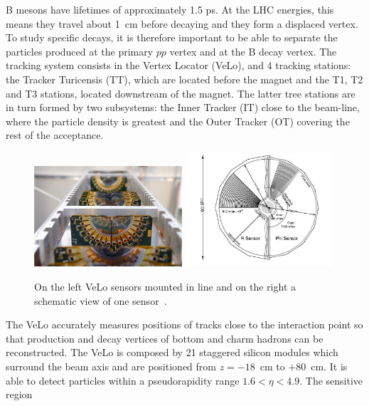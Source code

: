 B mesons have lifetimes of approximately 1.5 ps. At the LHC energies, this means they travel about
1~cm before decaying and they form a displaced vertex. To study specific decays, it is therefore important
to be able to separate the particles produced at the primary $pp$ vertex and at the B decay vertex.
The tracking system consists in the Vertex Locator (VeLo), and 4 tracking stations:
the Tracker Turicensis (TT), which are located before the magnet and the T1, T2 and T3 stations,
located downstream of the magnet. The latter tree stations are in turn formed by two subsystems:
the Inner Tracker (IT) close to the beam-line, where the particle density is greatest and
the Outer Tracker (OT) covering the rest of the acceptance.
%
\begin{center}
\begin{figure}[h!]
\centering 
\includegraphics[width=0.49\textwidth]{Detector/figs/detector/VELO.png}
\includegraphics[width=0.49\textwidth]{Detector/figs/detector/VELO_scheme.png}
\caption{On the left VeLo sensors mounted in line and on the right a schematic view of one sensor~\cite{Alves:2008zz}.}
\label{VeLo}
\end{figure}
\end{center}
%
The VeLo accurately measures positions of tracks close to the interaction point so that production
and decay vertices of bottom and charm hadrons can be reconstructed. The VeLo is composed by 21 staggered
silicon modules which surround the beam axis and are positioned from $z = -18$~cm to $+80$~cm.
It is able to detect particles within a pseudorapidity range $1.6 < \eta < 4.9$. The sensitive region
